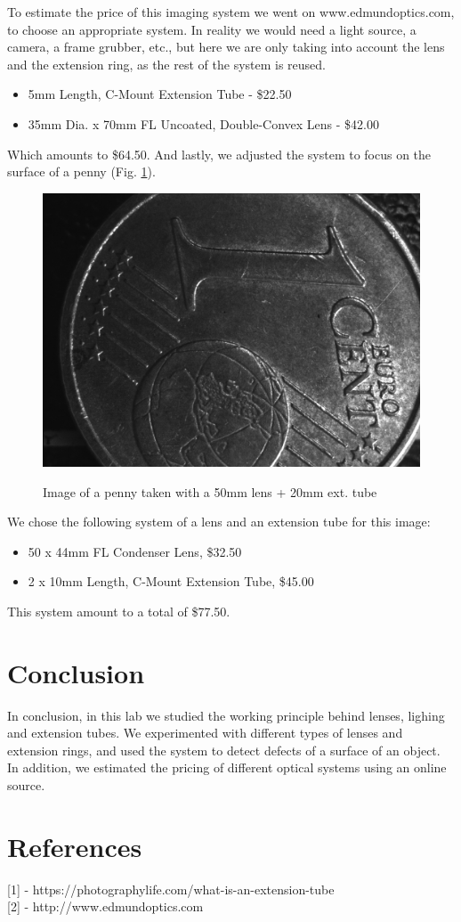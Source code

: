 \documentclass[english]{article}
\begin{document}
To estimate the price of this imaging system we went on www.edmundoptics.com, to choose an appropriate system. In reality we would need a light source, a camera, a frame grubber, etc., but here we are only taking into account the lens and the extension ring, as the rest of the system is reused.\\
\begin{itemize}
\item 
5mm Length, C-Mount Extension Tube - \$22.50\\
\item 35mm Dia. x 70mm FL Uncoated, Double-Convex Lens - \$42.00
\end{itemize}
Which amounts to \$64.50. 
And lastly, we adjusted the system to focus on the surface of a penny (Fig. \ref{fig:nine}).
\begin{figure}[H]
	\centering
	{\label{fig:}
	\includegraphics[width=0.7\linewidth]		{Pictures/bonus/50+20coin_distance_20mm_adj.png}
	}
	\caption{Image of a penny taken with a 50mm lens + 20mm ext. tube}
	\label{fig:nine}
\end{figure}
We chose the following system of a lens and an extension tube for this image:\\
\begin{itemize}
\item 50 x 44mm FL Condenser Lens, \$32.50\\
\item 2 x 10mm Length, C-Mount Extension Tube, \$45.00\\
\end{itemize}
This system amount to a total of \$77.50.

\section{Conclusion}
In conclusion, in this lab we studied the working principle behind lenses, lighing and extension tubes.
We experimented with different types of lenses and extension rings, and used the system to detect defects of a surface of an object. In addition, we estimated the pricing of different optical systems using an online source.

\section{References}
{[}1{]} - https://photographylife.com/what-is-an-extension-tube\\
{[}2{]} - http://www.edmundoptics.com
\end{document}
